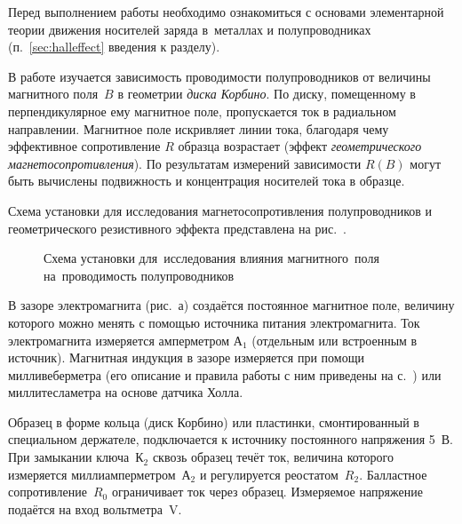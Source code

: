 


Перед выполнением работы необходимо ознакомиться с основами
элементарной теории движения носителей заряда в~металлах и полупроводниках
(п.~\ref{sec:halleffect} введения к разделу).

В работе изучается зависимость проводимости полупроводников от величины 
магнитного поля~$B$ в геометрии \emph{диска Корбино}.
По диску, помещенному в перпендикулярное ему магнитное поле, пропускается
ток в радиальном направлении. Магнитное поле искривляет линии 
тока, благодаря чему эффективное сопротивление $R$ образца возрастает
(эффект \emph{геометрического магнетосопротивления}). По результатам
измерений зависимости $R(B)$ могут быть вычислены подвижность и концентрация 
носителей тока в образце.

\experiment
Схема установки для исследования магнетосопротивления
полупроводников и геометрического резистивного эффекта представлена на
рис.~.

\begin{figure}[h!]
    \centering
    \caption{Схема установки для~исследования влияния магнитного~поля
        на~проводимость полупроводников}
\end{figure}

В зазоре электромагнита (рис.~а) создаётся постоянное магнитное
поле, величину которого можно менять с помощью источника питания электромагнита.
Ток электромагнита измеряется амперметром А$_1$ (отдельным или встроенным в источник).
Магнитная индукция в зазоре измеряется при помощи милливеберметра (его описание
и правила работы с ним приведены на с.~\pageref{MWB}) или 
миллитесламетра на основе датчика Холла.

Образец в форме кольца (диск Корбино) или пластинки, смонтированный в
специальном держателе, подключается к источнику постоянного напряжения 5~В. При
замыкании ключа~К$_2$ сквозь образец течёт ток, величина которого измеряется
миллиамперметром~А$_2$ и регулируется реостатом~$R_2$. Балластное сопротивление~$R_0$
ограничивает ток через образец. Измеряемое напряжение подаётся на вход
вольтметра~V.

